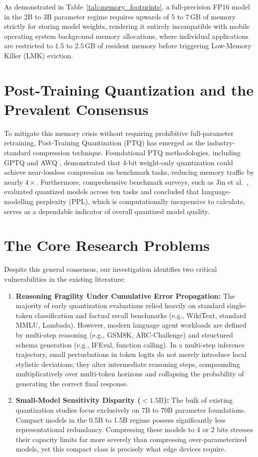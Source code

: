 \documentclass[12pt,a4paper,oneside]{report}
\begin{document}
As demonstrated in Table~\ref{tab:memory_footprints}, a full-precision FP16 model in the 2B to 3B parameter regime requires upwards of $5$ to $7\,\text{GB}$ of memory strictly for storing model weights, rendering it entirely incompatible with mobile operating system background memory allocations, where individual applications are restricted to $1.5$ to $2.5\,\text{GB}$ of resident memory before triggering Low-Memory Killer (LMK) eviction.

\section{Post-Training Quantization and the Prevalent Consensus}
To mitigate this memory crisis without requiring prohibitive full-parameter retraining, Post-Training Quantization (PTQ) has emerged as the industry-standard compression technique. Foundational PTQ methodologies, including GPTQ \cite{frantar2023gptq} and AWQ \cite{lin2024awq}, demonstrated that 4-bit weight-only quantization could achieve near-lossless compression on benchmark tasks, reducing memory traffic by nearly $4\times$. Furthermore, comprehensive benchmark surveys, such as Jin et al.~\cite{jin2024comprehensive}, evaluated quantized models across ten tasks and concluded that language-modelling perplexity (PPL), which is computationally inexpensive to calculate, serves as a dependable indicator of overall quantized model quality.

\section{The Core Research Problems}
Despite this general consensus, our investigation identifies two critical vulnerabilities in the existing literature:
\begin{enumerate}[leftmargin=*]
    \item \textbf{Reasoning Fragility Under Cumulative Error Propagation:} The majority of early quantization evaluations relied heavily on standard single-token classification and factual recall benchmarks (e.g., WikiText, standard MMLU, Lambada). However, modern language agent workloads are defined by multi-step reasoning (e.g., GSM8K, ARC-Challenge) and structured schema generation (e.g., IFEval, function calling). In a multi-step inference trajectory, small perturbations in token logits do not merely introduce local stylistic deviations; they alter intermediate reasoning steps, compounding multiplicatively over multi-token horizons and collapsing the probability of generating the correct final response.
    \item \textbf{Small-Model Sensitivity Disparity ($<1.5\text{B}$):} The bulk of existing quantization studies focus exclusively on 7B to 70B parameter foundations. Compact models in the 0.5B to 1.5B regime possess significantly less representational redundancy. Compressing these models to 4 or 2 bits stresses their capacity limits far more severely than compressing over-parameterized models, yet this compact class is precisely what edge devices require.
\end{enumerate}
\end{document}
